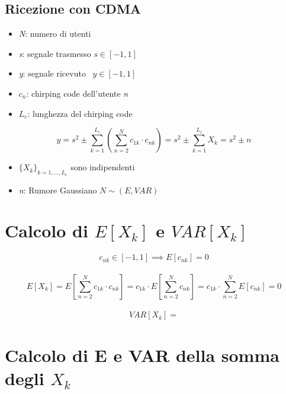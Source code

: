 \documentclass[12pt, a4paper]{article}
\begin{document}
	
\begin{center}
	\section*{Ricezione con CDMA}
\end{center}

\begin{itemize}
	\item \textit{N}: numero di utenti
	\item \textit{s}: segnale trasmesso $s\in[-1,1]$ 
	\item \textit{y}: segnale ricevuto \, $y\in[-1,1]$ 
	\item $c_n$: chirping code dell'utente \textit{n}
	\item $L_c$: lunghezza del chirping code
\end{itemize}

\[
y = s^2 \pm \sum_{k=1}^{L_c}\left(\sum_{n=2}^{N}c_{1k}\cdot c_{nk}\right)
  = s^2 \pm \sum_{k=1}^{L_c}X_k 
  = s^2 \pm n \] 

\begin{itemize}
	\item $\{X_k\}_{k=1,\dots,L_c}$ sono indipendenti
	\item \textit{n}: Rumore Gaussiano $N\sim (E,VAR)$
\end{itemize}
	
	
\section{Calcolo di $E[X_k]$ e $VAR[X_k]$}
\[
c_{nk}\in [-1,1] \implies E[c_{nk}] = 0
\] \\\vspace{-.5cm} \[
E[X_k] = E\left[\sum_{n=2}^{N}c_{1k}\cdot c_{nk}\right] 
       = c_{1k}\cdot E\left[\sum_{n=2}^{N}c_{nk}\right]
       = c_{1k}\cdot \sum_{n=2}^{N}E[c_{nk}] 
       = 0 
\] \\\vspace{-.5cm} \[
VAR[X_k] = 
\]
	
\section{Calcolo di E e VAR della somma degli $X_k$}
\end{document}
